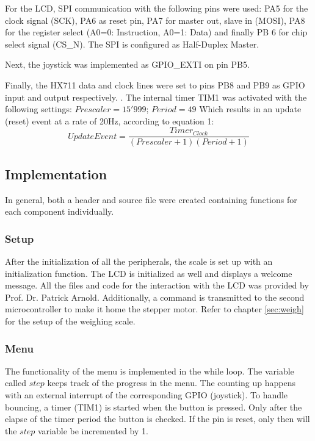 \documentclass[twocolumn]{article}
\begin{document}
	For the LCD, SPI communication with the following pins were used: PA5 for the clock signal (SCK), PA6 as reset pin, PA7 for master out, slave in (MOSI), PA8 for the register select (A0=0: Instruction, A0=1: Data) and finally PB 6 for chip select signal (CS\_N). The SPI is configured as Half-Duplex Master.
		
	Next, the joystick was implemented as GPIO\_EXTI on pin PB5. 
	
	Finally, the HX711 data and clock lines were set to pins PB8 and PB9 as GPIO input and output respectively.
.
	The internal timer TIM1 was activated with the following settings:\newline
	$Prescaler = 15'999$; $Period = 49$ \newline
	Which results in an update (reset) event at a rate of 20Hz, according to equation 1:
	\begin{equation}
	UpdateEvent = \frac{Timer_{Clock}}{(Prescaler+1)(Period+1)}
	\end{equation}

	 
	\subsection{Implementation}
	In general, both a header and source file were created containing functions for each component individually. 
	\subsubsection{Setup}
	After the initialization of all the peripherals, the scale is set up with an initialization function. The LCD is initialized as well and displays a welcome message. All the files and code for the interaction with the LCD was provided by Prof. Dr. Patrick Arnold.\newline
	Additionally, a command is transmitted to the second microcontroller to make it home the stepper motor.
	Refer to chapter \ref{sec:weigh}  for the setup of the weighing scale.
	\subsubsection{Menu} \label{sec:menu}
	The functionality of the menu is implemented in the while loop. The variable called $step$ keeps track of the progress in the menu. The counting up happens with an external interrupt of the corresponding GPIO (joystick). To handle bouncing, a timer (TIM1) is started when the button is pressed. Only after the elapse of the timer period the button is checked. If the pin is reset, only then will the $step$ variable be incremented by 1.
	
\end{document}
